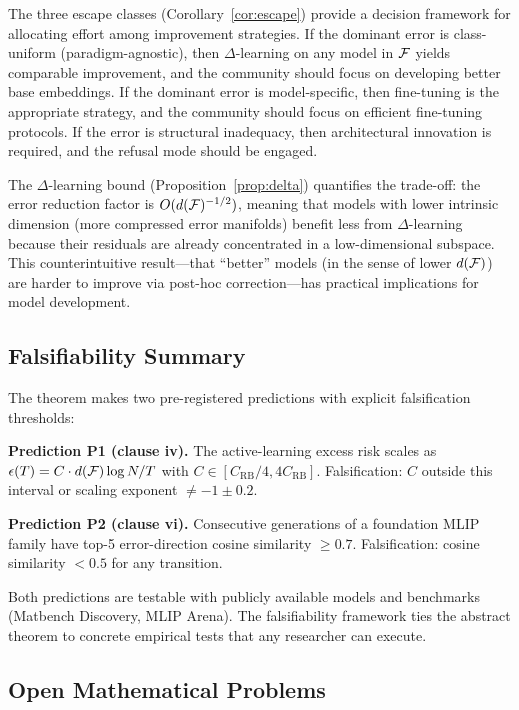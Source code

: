 The three escape classes (Corollary~\ref{cor:escape}) provide a decision framework for allocating effort among improvement strategies. If the dominant error is class-uniform (paradigm-agnostic), then $\Delta$-learning on any model in $\mathcal{F}$ yields comparable improvement, and the community should focus on developing better base embeddings. If the dominant error is model-specific, then fine-tuning is the appropriate strategy, and the community should focus on efficient fine-tuning protocols\cite{hanseroth2025finetuning}. If the error is structural inadequacy, then architectural innovation is required, and the refusal mode should be engaged.

The $\Delta$-learning bound (Proposition~\ref{prop:delta}) quantifies the trade-off: the error reduction factor is $O(d(\mathcal{F})^{-1/2})$, meaning that models with lower intrinsic dimension (more compressed error manifolds) benefit less from $\Delta$-learning because their residuals are already concentrated in a low-dimensional subspace. This counterintuitive result---that ``better'' models (in the sense of lower $d(\mathcal{F})$) are harder to improve via post-hoc correction---has practical implications for model development.

\subsection{Falsifiability Summary}

The theorem makes two pre-registered predictions with explicit falsification thresholds:

\textbf{Prediction P1 (clause iv).} The active-learning excess risk scales as $\epsilon(T) = C \cdot d(\mathcal{F}) \log N / T$ with $C \in [C_{\text{RB}}/4, 4 C_{\text{RB}}]$. Falsification: $C$ outside this interval or scaling exponent $\neq -1 \pm 0.2$.

\textbf{Prediction P2 (clause vi).} Consecutive generations of a foundation MLIP family have top-5 error-direction cosine similarity $\geq 0.7$. Falsification: cosine similarity $< 0.5$ for any transition.

Both predictions are testable with publicly available models and benchmarks (Matbench Discovery, MLIP Arena). The falsifiability framework ties the abstract theorem to concrete empirical tests that any researcher can execute.

\subsection{Open Mathematical Problems}

